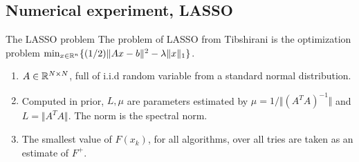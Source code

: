 \documentclass[11pt]{beamer}
\theoremstyle{definition}
\begin{document}
    \subsection{Numerical experiment, LASSO}
        \begin{frame}{The LASSO problem}
            The problem of LASSO from Tibshirani \cite{tibshirani_regression_1996} is the optimization problem $\min_{x \in \mathbb R^n}\{(1/2)\Vert Ax - b\Vert^2 - \lambda\Vert x\Vert_1\}$. 
            \begin{enumerate}
                \item $A \in \mathbb R^{N \times N}$, full of i.i.d random variable from a standard normal distribution. 
                \item Computed in prior, $L, \mu$ are parameters estimated by $\mu = 1/\Vert (A^TA)^{-1}\Vert$ and $L = \Vert A^TA\Vert$. The norm is the spectral norm. 
                \item The smallest value of $F(x_k)$, for all algorithms, over all tries are taken as an estimate of $F^+$. 
            \end{enumerate}
        \end{frame}
\end{document}
